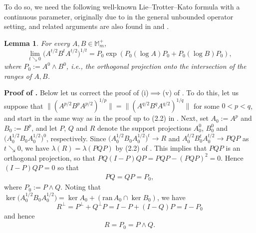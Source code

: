 \documentclass[11pt,reqno]{article}
\newtheorem{lemma}[theorem]{Lemma}
\numberwithin{equation}{section}
\def\bM{\mathbb{M}}
\begin{document}
To do so, we need the following well-known Lie--Trotter--Kato formula with a continuous parameter, originally
due to \cite{Ka} in the general unbounded operator setting, and related arguments are also found in \cite{HP0}
and \cite{Hi0}.

\begin{lemma}\label{L-A.1}
For every $A,B\in\bM_m^+$,
\[
\lim_{t\searrow0}\bigl(A^{t/2}B^tA^{t/2}\bigr)^{1/t}
=P_0\exp(P_0(\log A)P_0+P_0(\log B)P_0),
\]
where $P_0:=A^0\wedge B^0$, i.e., the orthogonal projection onto the intersection of the ranges of $A,B$.
\end{lemma}

\noindent
{\bf Proof of \cite[Theorem 2.1]{Hi}.}\quad
Below let us correct the proof of (i)$\implies$(v) of \cite[Theorem 2.1]{Hi}. To do this, let us suppose that
$\big\|(A^{p/2}B^pA^{p/2})^{1/p}\big\|=\big\|(A^{q/2}B^qA^{q/2})^{1/q}\big\|$ for some $0<p<q$, and start in
the same way as in the proof up to (2.2) in \cite{Hi}. Next, set $A_0:=A^p$ and $B_0:=B^p$, and let
$P$, $Q$ and $R$ denote the support projections $A_0^0$, $B_0^0$ and
$\bigl(A_0^{1/2}B_0A_0^{1/2}\bigr)^0$, respectively. Since $\bigl(A_0^{1/2}B_0A_0^{1/2}\bigr)^t\to R$ and
$A_0^{t/2}B_0^tA_0^{t/2}\to PQP$ as $t\searrow0$, we have $\lambda(R)=\lambda(PQP)$ by (2.2) of \cite{Hi}.
This implies that $PQP$ is an orthogonal projection, so that $PQ(I-P)QP=PQP-(PQP)^2=0$. Hence
$(I-P)QP=0$ so that
\begin{align}\label{F-A.2}
PQ=QP=P_0,
\end{align}
where $P_0:=P\wedge Q$. Noting that
$\ker\bigl(A_0^{1/2}B_0A_0^{1/2}\bigr)=\ker A_0+(\mathrm{ran}\,A_0\cap\ker B_0)$, we have
\[
R^\perp=P^\perp+Q^\perp P=I-P+(I-Q)P=I-P_0
\]
and hence
\begin{align}\label{F-A.3}
R=P_0=P\wedge Q.
\end{align}
\end{document}
